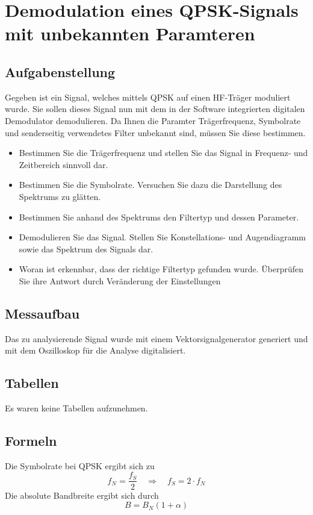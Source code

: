 \documentclass[12pt,a4paper,ngerman]{article}
\begin{document}


%
%

\section{Demodulation eines QPSK-Signals mit unbekannten Paramteren}
\subsection{Aufgabenstellung}
Gegeben ist ein Signal, welches mittels QPSK auf einen HF-Träger moduliert wurde. Sie sollen dieses Signal nun mit dem in der Software integrierten digitalen Demodulator demodulieren. Da Ihnen die Paramter Trägerfrequenz, Symbolrate und senderseitig verwendetes Filter unbekannt sind, müssen Sie diese bestimmen.
\begin{itemize}
\item Bestimmen Sie die Trägerfrequenz und stellen Sie das Signal in Frequenz- und Zeitbereich sinnvoll dar. 
\item Bestimmen Sie die Symbolrate. Versuchen Sie dazu die Darstellung des Spektrums zu glätten.
\item Bestimmen Sie anhand des Spektrums den Filtertyp und dessen Parameter.
\item Demodulieren Sie das Signal. Stellen Sie Konstellations- und Augendiagramm sowie das Spektrum des Signals dar. 
\item Woran ist erkennbar, dass der richtige Filtertyp gefunden wurde. Überprüfen Sie ihre Antwort durch Veränderung der Einstellungen
\end{itemize}
\subsection{Messaufbau}
Das zu analysierende Signal wurde mit einem Vektorsignalgenerator generiert und mit dem Oszilloskop für die Analyse digitalisiert.  
\subsection{Tabellen}
Es waren keine Tabellen aufzunehmen. 
\subsection{Formeln}
Die Symbolrate bei QPSK ergibt sich zu
\begin{equation}
f_N = \frac{f_S}{2} \quad \Rightarrow \quad f_S = 2 \cdot f_N
\end{equation}
Die absolute Bandbreite ergibt sich durch
\begin{equation}
B = B_N (1+\alpha)
\end{equation}
\pagebreak
\end{document}
